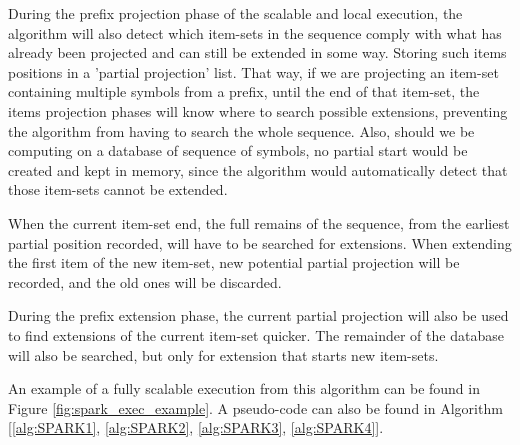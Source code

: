 \documentclass{eplmastersthesis}
\begin{document}
During the prefix projection phase of the scalable and local execution, the algorithm will also detect which item-sets in the sequence comply with what has already been projected and can still be extended in some way. Storing such items positions in a 'partial projection' list. \newline
That way, if we are projecting an item-set containing multiple symbols from a prefix, until the end of that item-set, the items projection phases will know where to search possible extensions, preventing the algorithm from having to search the whole sequence. \newline
Also, should we be computing on a database of sequence of symbols, no partial start would be created and kept in memory, since the algorithm would automatically detect that those item-sets cannot be extended. \newline

When the current item-set end, the full remains of the sequence, from the earliest partial position recorded, will have to be searched for extensions. When extending the first item of the new item-set, new potential partial projection will be recorded, and the old ones will be discarded. \newline

During the prefix extension phase, the current partial projection will also be used to find extensions of the current item-set quicker. The remainder of the database will also be searched, but only for extension that starts new item-sets. \newline

An example of a fully scalable execution from this algorithm can be found in Figure \ref{fig:spark_exec_example}. A pseudo-code can also be found in Algorithm [\ref{alg:SPARK1}, \ref{alg:SPARK2}, \ref{alg:SPARK3}, \ref{alg:SPARK4}]. \newline
\end{document}
